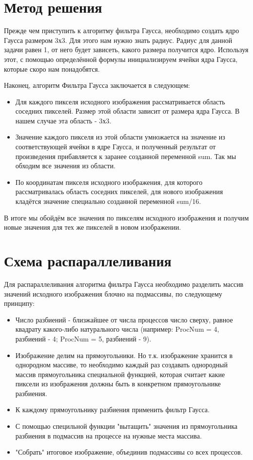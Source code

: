\documentclass{report}
\begin{document}
\section*{Метод решения}
Прежде чем приступить к алгоритму фильтра Гаусса, необходимо создать ядро Гаусса размером 3х3. Для этого нам нужно знать радиус. Радиус для данной задачи равен 1, от него будет зависеть, какого размера получится ядро. Используя этот, с помощью определённой формулы инициализируем ячейки ядра Гаусса, которые скоро нам понадобятся.
\par Наконец, алгоритм Фильтра Гаусса заключается в следующем:
\begin{itemize}
\item Для каждого пикселя исходного изображения рассматривается область соседних пикселей. Размер этой области зависит от размера ядра Гаусса. В нашем случае эта область - 3х3.
\item Значение каждого пикселя из этой области умножается на значение из соответствующей ячейки в ядре Гаусса, и полученный результат от произведения прибавляется к заранее созданной переменной sum. Так мы обходим все значения из области.
\item По координатам пикселя исходного изображения, для которого рассматривалась область соседних пикселей, для нового изображения кладётся значение специально созданной переменной sum/16.
\end{itemize}
\par В итоге мы обойдём все значения по пикселям исходного изображения и получим новые значения для тех же пикселей в новом изображении.

\newpage
\section*{Схема распараллеливания}
Для распараллеливания алгоритма фильтра Гаусса необходимо разделить массив значений исходного изображения блочно на подмассивы, по следующему принципу:
\begin{itemize}
\item Число разбиений - близжайшее от числа процессов число сверху, равное квадрату какого-либо натурального числа (например: ProcNum = 4, разбиений - 4; ProcNum = 5, разбиений - 9). 
\item Изображение делим на прямоугольники. Но т.к. изображение хранится в однородном массиве, то необходимо каждый раз создавать однородный массив прямоугольника специальной функцией, которая считает какие пиксели из изображения должны быть в конкретном прямоугольнике разбиения.
\item К каждому прямоугольнику разбиения применить фильтр Гаусса.
\item С помощью специльной функции "вытащить" значения из прямоугольника разбиения в подмассив на процессе на нужные места массива.
\item "Собрать" итоговое изображение, объединив подмассивы со всех процессов.
\end{itemize}
\newpage
\end{document}
